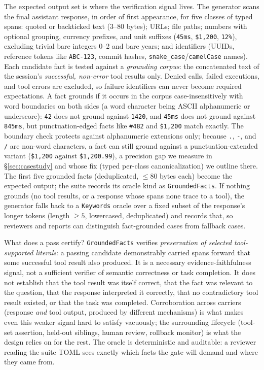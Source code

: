 \documentclass{article}
\newcommand{\code}[1]{\texttt{\small #1}}
\begin{document}
The expected output set is where the verification signal lives. The generator scans the final assistant response, in order of first appearance, for five classes of typed spans: quoted or backticked text (3--80 bytes); URLs; file paths; numbers with optional grouping, currency prefixes, and unit suffixes (\code{45ms}, \code{\$1,200}, \code{12\%}), excluding trivial bare integers 0--2 and bare years; and identifiers (UUIDs, reference tokens like \code{ABC-123}, commit hashes, \code{snake\_case}/\code{camelCase} names). Each candidate fact is tested against a \emph{grounding corpus}: the concatenated text of the session's \emph{successful, non-error} tool results only. Denied calls, failed executions, and tool errors are excluded, so failure identifiers can never become required expectations. A fact grounds if it occurs in the corpus case-insensitively with word boundaries on both sides (a word character being ASCII alphanumeric or underscore): \code{42} does not ground against \code{1420}, and \code{45ms} does not ground against \code{845ms}, but punctuation-edged facts like \code{\#482} and \code{\$1,200} match exactly. The boundary check protects against alphanumeric extensions only; because \code{.}, \code{-}, and \code{/} are non-word characters, a fact can still ground against a punctuation-extended variant (\code{\$1,200} against \code{\$1,200.99}), a precision gap we measure in \S\ref{sec:casestudy} and whose fix (typed per-class canonicalization) we outline there. The first five grounded facts (deduplicated, $\leq$80 bytes each) become the expected output; the suite records its oracle kind as \code{GroundedFacts}. If nothing grounds (no tool results, or a response whose spans none trace to a tool), the generator falls back to a \code{Keywords} oracle over a fixed subset of the response's longer tokens (length $\geq 5$, lowercased, deduplicated) and records that, so reviewers and reports can distinguish fact-grounded cases from fallback cases.

What does a pass certify? \code{GroundedFacts} verifies \emph{preservation of selected tool-supported literals}: a passing candidate demonstrably carried spans forward that some successful tool result also produced. It is a necessary evidence-faithfulness signal, not a sufficient verifier of semantic correctness or task completion. It does not establish that the tool result was itself correct, that the fact was relevant to the question, that the response interpreted it correctly, that no contradictory tool result existed, or that the task was completed. Corroboration across carriers (response \emph{and} tool output, produced by different mechanisms) is what makes even this weaker signal hard to satisfy vacuously; the surrounding lifecycle (tool-set assertion, held-out siblings, human review, rollback monitor) is what the design relies on for the rest. The oracle is deterministic and auditable: a reviewer reading the suite TOML sees exactly which facts the gate will demand and where they came from.
\end{document}
